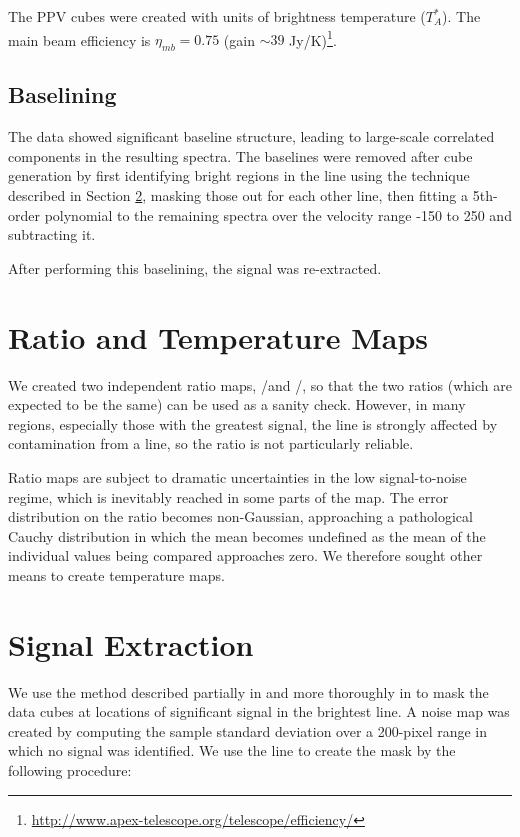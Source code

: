
The PPV cubes were created with units of brightness temperature ($T_A^*$).  The
main beam efficiency is $\eta_{mb} = 0.75$ (gain $\sim39$
Jy/K)\footnote{\url{http://www.apex-telescope.org/telescope/efficiency/}}.



\subsection{Baselining}
\label{sec:baseline}
The data showed significant baseline structure, leading to large-scale
correlated components in the resulting spectra.  The baselines were removed
after cube generation by first identifying bright regions in the \para
\threeohthree line using the technique described in Section \ref{sec:signal},
masking those out for each other line, then fitting a 5th-order polynomial to
the remaining spectra over the velocity range -150 to 250 \kms and subtracting
it.

After performing this baselining, the signal was re-extracted.

\section{Ratio and Temperature Maps}
\label{sec:h2co}
We created two independent ratio maps, \threeohthree/\threetwotwo and
\threeohthree/\threetwoone, so that the two ratios (which are expected to be
the same) can be used as a sanity check.  However, in many regions, especially
those with the greatest signal, the \threetwotwo line is strongly affected by
contamination from a \methanol line, so the ratio is not particularly reliable.

Ratio maps are subject to dramatic uncertainties in the low signal-to-noise
regime, which is inevitably reached in some parts of the map.  The error
distribution on the ratio becomes non-Gaussian, approaching a pathological
Cauchy distribution in which the mean becomes undefined as the mean of the
individual values being compared approaches zero.  We therefore sought other
means to create temperature maps.

\section{Signal Extraction}
\label{sec:signal}
We use the method described partially in \citet{Ao2013a} and more thoroughly in
\citet{Dame2011b} to mask the data cubes at locations of significant signal in 
the brightest line. 
A noise map was created by computing the sample standard deviation over a
200-pixel range in which no signal was identified.
We use the \formaldehyde \threeohthree line to create the mask by
the following procedure:

